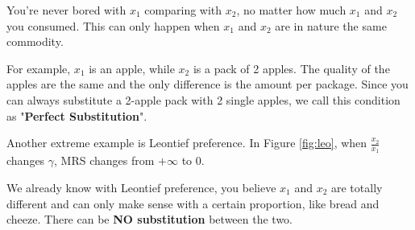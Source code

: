 \documentclass{article}
\begin{document}
\begin{mdframed}[backgroundcolor=blue!20,linecolor=white]
\begin{center}
\label{fig:straight}
\end{center}
\vspace{2mm}

You're never bored with $x_1$ comparing with $x_2$, no matter how much $x_1$ and $x_2$ you consumed. This can only happen when $x_1$ and $x_2$ are in nature the same commodity. 

For example, $x_1$ is an apple, while $x_2$ is a pack of 2 apples. The quality of the apples are the same and the only difference is the amount per package. Since you can always substitute a 2-apple pack with 2 single apples, we call this condition as "\textbf{Perfect Substitution}".

\vspace{6mm}

Another extreme example is Leontief preference.  In Figure \ref{fig:leo}, when $\frac{x_2}{x_1}$ changes $\gamma$, MRS changes from $+\infty$ to $0$.

\begin{center}
\label{fig:leo}
\end{center}

We already know with Leontief preference, you believe $x_1$ and $x_2$ are totally different and can only make sense with a certain proportion, like bread and cheeze. There can be \textbf{NO substitution} between the two.



\end{mdframed}
\end{document}
